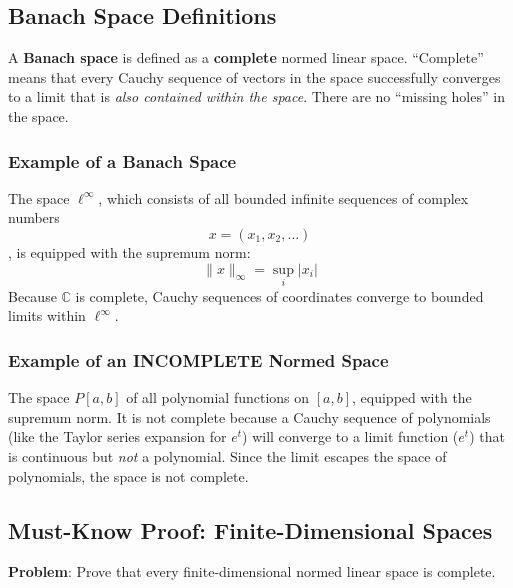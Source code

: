 \documentclass[
]{article}
\begin{document}
\subsection{Banach Space Definitions}\label{banach-space-definitions}

A \textbf{Banach space} is defined as a \textbf{complete} normed linear
space. ``Complete'' means that every Cauchy sequence of vectors in the
space successfully converges to a limit that is \emph{also contained
within the space}. There are no ``missing holes'' in the space.

\subsubsection{Example of a Banach
Space}\label{example-of-a-banach-space}

The space \(\ell^\infty\), which consists of all bounded infinite
sequences of complex numbers
\[
x = (x_1, x_2, \dots)
\]
, is equipped with the supremum norm:
\[
\|x\|_\infty = \sup_{i} \lvert x_i \rvert
\]
Because \(\mathbb{C}\) is complete, Cauchy sequences of coordinates
converge to bounded limits within \(\ell^\infty\).

\subsubsection{Example of an INCOMPLETE Normed
Space}\label{example-of-an-incomplete-normed-space}

The space \(P[a, b]\) of all polynomial functions on \([a, b]\),
equipped with the supremum norm. It is not complete because a Cauchy
sequence of polynomials (like the Taylor series expansion for \(e^t\))
will converge to a limit function (\(e^t\)) that is continuous but
\emph{not} a polynomial. Since the limit escapes the space of
polynomials, the space is not complete.

\subsection{Must-Know Proof: Finite-Dimensional
Spaces}\label{must-know-proof-finite-dimensional-spaces}

\textbf{Problem}: Prove that every finite-dimensional normed linear
space is complete.
\end{document}
